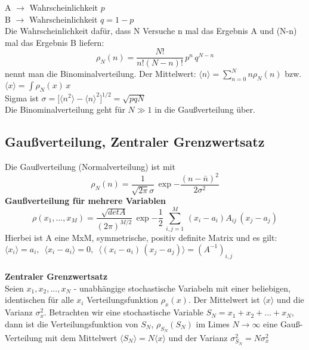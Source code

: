 \documentclass[a4paper,11pt]{scrartcl}
\begin{document}
A $\rightarrow$ Wahrscheinlichkeit $p$\\
B $\rightarrow$ Wahrscheinlichkeit $q= 1-p$\\
Die Wahrscheinlichkeit dafür, dass N Versuche n mal das Ergebnis A und (N-n) mal das Ergebnis B liefern: 
\begin{equation}
 \rho_N(n) = \frac{N!}{n! (N-n)!} \, p^n \, q^{N-n}
\end{equation}
nennt man die Binominalverteilung.
Der Mittelwert: $\langle n \rangle = \sum_{n=0}^N n \rho_N(n) $
bzw. $\langle x \rangle = \int \rho_N(x) \,x $\\
Sigma ist $ \sigma= \lbrack \langle n^2 \rangle - \langle n \rangle^2 \rbrack^{1/2} = \sqrt{pqN}  $\\
Die Binominalverteilung geht für $N \gg 1$ in die Gaußverteilung über.
\subsection{Gaußverteilung, Zentraler Grenzwertsatz}
Die Gaußverteilung (Normalverteilung) ist mit 
\begin{equation}
 \rho_N(n) = \frac{1}{\sqrt{2 \pi} \sigma}\, \exp{- \frac{(n-\bar{n})^2}{2 \sigma^2}}
\end{equation}
\textbf{Gaußverteilung für mehrere Variablen}
$$\rho(x_1, ..., x_M) = \frac{\sqrt{det A}}{(2 \pi)^{M/2}}\, \exp{-\frac{1}{2}\, \sum_{i,j=1}^M \, (x_i-a_i) A_{ij} \, (x_j-a_j)}$$
Hierbei ist A eine MxM, symmetrische, positiv definite Matrix und es gilt:\\
$\langle x_i \rangle = a_i, \,\,\, \langle x_i-a_i \rangle = 0, \,\,\, \langle (x_i-a_i)\, (x_j-a_j) \rangle = (A^{-1})_{i,j}$\\
\\
\textbf{Zentraler Grenzwertsatz}\\
Seien $x_1, x_2,..., x_N$ - unabhängige stochastische Variabeln mit einer beliebigen, identischen für alle $x_i$ Verteilungsfunktion $\rho_x(x)$. Der Mittelwert ist $\langle x \rangle$ und die Varianz $ \sigma_x^2$.
Betrachten wir eine stochastische Variable $S_N= x_1+x_2+...+x_N$,\\ dann ist die Verteilungsfunktion von $S_N$, $\rho_{S_N}(S_N)$ im Limes $N \rightarrow \infty$ eine Gauß-Verteilung  mit dem Mittelwert $\langle S_N \rangle = N\langle x \rangle$ und der Varianz $\sigma_{S_N}^2 = N \sigma_x^2$
\end{document}
